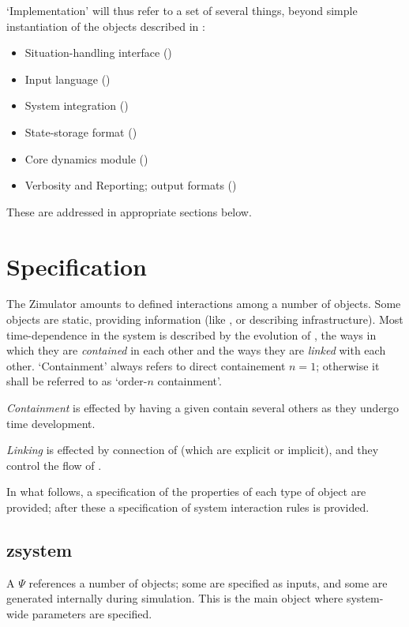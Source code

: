 `Implementation' will thus refer to a set of several things, beyond simple instantiation of the objects described in :
\begin{itemize}
\item Situation-handling interface ()
\item Input language ()
\item System integration ()
\item State-storage format ()
\item Core dynamics module ()
\item Verbosity and Reporting; output formats ()
\end{itemize}
These are addressed in appropriate sections below.

\section{Specification}
\label{secobjs}

The Zimulator amounts to defined interactions among a number of
objects.  Some objects are static, providing information (like
, or  describing infrastructure).  Most
time-dependence in the system is described by the evolution of
, the ways in which they are \emph{contained} in each
other and the ways they are \emph{linked} with each other.
`Containment' always refers to direct containement $n=1$; otherwise it
shall be referred to as `order-$n$ containment'.

\emph{Containment} is effected by having a given  contain
several others as they undergo time development.

\emph{Linking} is effected by connection of  (which are
explicit or implicit), and they control the flow of .

In what follows, a specification of the properties of each type of
object are provided; after these a specification of system interaction
rules is provided.

\subsection{zsystem}
\label{zsystemsec}
A  $\Psi$ references a number of objects; some are specified as inputs,
and some are generated internally during simulation.
This is the main object where system-wide parameters are specified.

